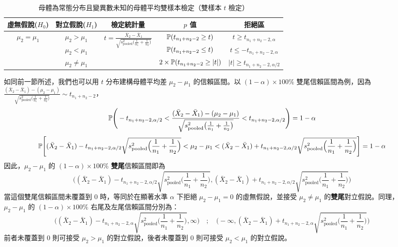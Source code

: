     \begin{table}[htbp]
        \begin{center}
            \begin{tabular}{ccccc}
                \toprule
                虛無假說($H_0$) & 對立假說($H_1$) & 檢定統計量 & $p$ 值 & 拒絕區\\
                \hline
                \multirow{3}{*}{$\mu_2 = \mu_1$} & $\mu_2 > \mu_1$ & \multirow{3}{*}{$t = \frac{\bar{X}_2-\bar{X}_1}{\sqrt{s_{\text{pooled}}^2\big(\frac{1}{n_1} + \frac{1}{n_2}\big)}}$} & $\mathbb{P}(t_{n_1+n_2-2} \ge t)$ & $t \ge t_{n_1+n_2-2,\alpha}$\\
                & $\mu_2 < \mu_1$ & &$\mathbb{P}(t_{n_1+n_2-2} \le t)$&$t \le -t_{n_1+n_2-2,\alpha}$\\
                & $\mu_2 \ne \mu_1$ & &$2\times\mathbb{P}(t_{n_1+n_2-2} \ge |t|)$&$|t| \ge t_{n_1+n_2-2,\alpha/2}$\\
                \bottomrule
            \end{tabular}
            \caption{母體為常態分布且變異數未知的母體平均雙樣本檢定（雙樣本 $t$ 檢定）\label{tab:two_sample_t}}
        \end{center}
    \end{table}

    如同前一節所述，我們也可以用 $t$ 分布建構母體平均差 $\mu_2 - \mu_1$ 的信賴區間。以 $(1-\alpha) \times 100\%$ 雙尾信賴區間為例，因為 $\frac{(\bar{X}_2-\bar{X}_1)-(\mu_2-\mu_1)}{\sqrt{s_{\text{pooled}}^2\big(\frac{1}{n_1} + \frac{1}{n_2}\big)}} \sim t_{n_1+n_2-2}$，
    \[\mathbb{P}\Bigg(-t_{n_1+n_2-2,\alpha/2} < \frac{(\bar{X}_2-\bar{X}_1)-(\mu_2-\mu_1)}{\sqrt{s_{\text{pooled}}^2\big(\frac{1}{n_1} + \frac{1}{n_2}\big)}} < t_{n_1+n_2-2,\alpha/2}\Bigg) = 1-\alpha\]
    \[\mathbb{P}\Bigg[(\bar{X}_2-\bar{X}_1) - t_{n_1+n_2-2,\alpha/2} \sqrt{s_{\text{pooled}}^2\Big(\frac{1}{n_1} + \frac{1}{n_2}\Big)} < \mu_2-\mu_1  < (\bar{X}_2-\bar{X}_1) + t_{n_1+n_2-2,\alpha/2} \sqrt{s_{\text{pooled}}^2\Big(\frac{1}{n_1} + \frac{1}{n_2}\Big)}\Bigg] = 1-\alpha\]
    因此，$\mu_2-\mu_1$ 的 $(1-\alpha) \times 100\%$ \textbf{雙尾}信賴區間即為
    \[\Bigg((\bar{X}_2-\bar{X}_1) - t_{n_1+n_2-2,\alpha/2} \sqrt{s_{\text{pooled}}^2\Big(\frac{1}{n_1} + \frac{1}{n_2}\Big)}, (\bar{X}_2-\bar{X}_1) + t_{n_1+n_2-2,\alpha/2} \sqrt{s_{\text{pooled}}^2\Big(\frac{1}{n_1} + \frac{1}{n_2}\Big)}\Bigg)\]
    當這個雙尾信賴區間未覆蓋到 $0$ 時，等同於在顯著水準 $\alpha$ 下拒絕 $\mu_2 - \mu_1 = 0$ 的虛無假說，並接受 $\mu_2 \ne \mu_1$ 的\textbf{雙尾}對立假說。同理，$\mu_2-\mu_1$ 的 $(1-\alpha) \times 100\%$ 右尾及左尾信賴區間分別為：
    \[\Bigg((\bar{X}_2-\bar{X}_1) - t_{n_1+n_2-2,\alpha} \sqrt{s_{\text{pooled}}^2\Big(\frac{1}{n_1} + \frac{1}{n_2}\Big)}, \infty \Bigg)\quad ; \quad\Bigg(-\infty, (\bar{X}_2-\bar{X}_1) + t_{n_1+n_2-2,\alpha} \sqrt{s_{\text{pooled}}^2\Big(\frac{1}{n_1} + \frac{1}{n_2}\Big)} \Bigg)\]
    前者未覆蓋到 $0$ 則可接受 $\mu_2 > \mu_1$ 的對立假說，後者未覆蓋到 $0$ 則可接受 $\mu_2 < \mu_1$ 的對立假說。
    
